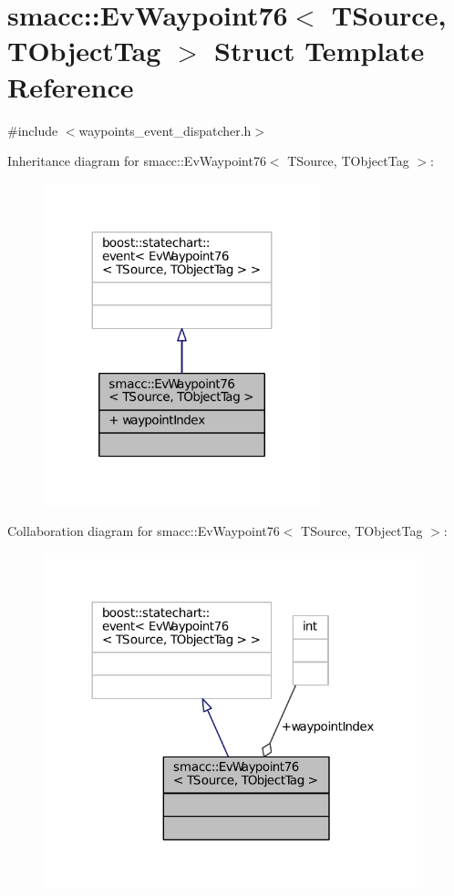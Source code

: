 \hypertarget{structsmacc_1_1EvWaypoint76}{}\section{smacc\+:\+:Ev\+Waypoint76$<$ T\+Source, T\+Object\+Tag $>$ Struct Template Reference}
\label{structsmacc_1_1EvWaypoint76}


{\ttfamily \#include $<$waypoints\+\_\+event\+\_\+dispatcher.\+h$>$}



Inheritance diagram for smacc\+:\+:Ev\+Waypoint76$<$ T\+Source, T\+Object\+Tag $>$\+:
\nopagebreak
\begin{figure}[H]
\begin{center}
\leavevmode
\includegraphics[width=227pt]{structsmacc_1_1EvWaypoint76__inherit__graph}
\end{center}
\end{figure}


Collaboration diagram for smacc\+:\+:Ev\+Waypoint76$<$ T\+Source, T\+Object\+Tag $>$\+:
\nopagebreak
\begin{figure}[H]
\begin{center}
\leavevmode
\includegraphics[width=312pt]{structsmacc_1_1EvWaypoint76__coll__graph}
\end{center}
\end{figure}
